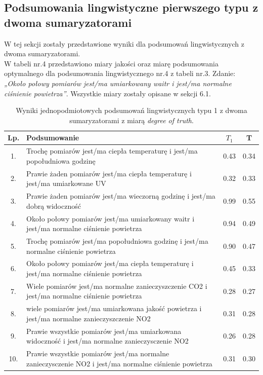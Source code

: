 \documentclass{article}
\begin{document}
\subsection{Podsumowania lingwistyczne pierwszego typu z dwoma sumaryzatorami}
W tej sekcji zostały przedstawione wyniki dla podsumowań lingwistycznych z dwoma sumaryzatorami.\\
W tabeli nr.4 przedstawiono miary jakości oraz miarę podsumowania optymalnego dla podsumowania lingwistycznego nr.4 z tabeli nr.3. Zdanie: \textit{„Około połowy pomiarów  jest/ma umiarkowany waitr i jest/ma normalne ciśnienie powietrza”}. Wszystkie miary zostały opisane w sekcji 6.1.


\begin{table}[H]
\begin{center}
\normalsize %
\begin{tabular}{|c|p{8cm}|c|c|} %
\hline
\textbf{Lp.} & \textbf{Podsumowanie} & \textbf{\(T_1\)} & \textbf{T} \\ \hline
1. & Trochę pomiarów jest/ma ciepła temperaturę i jest/ma popołudniowa godzinę & 0.43 & 0.34 \\ \hline
2. & Prawie żaden pomiarów jest/ma ciepła temperaturę i jest/ma umiarkowane UV & 0.32 & 0.33 \\ \hline
3. & Prawie żaden pomiarów jest/ma wieczorną godzinę i jest/ma dobrą widoczność & 0.99 & 0.55 \\ \hline
4. & Około połowy pomiarów  jest/ma umiarkowany waitr i jest/ma normalne ciśnienie powietrza & 0.94 & 0.49 \\ \hline
5. & Trochę pomiarów jest/ma popołudniowa godzinę i jest/ma normalne ciśnienie powietrza & 0.90 & 0.47 \\ \hline
6. & Około połowy pomiarów jest/ma ciepła temperaturę i jest/ma normalne ciśnienie  powietrza & 0.45 & 0.33 \\ \hline
7. & Wiele pomiarów  jest/ma normalne zanieczyszczenie CO2 i jest/ma normalne ciśnienie powietrza & 0.28 & 0.27 \\ \hline
8. & wiele pomiarów  jest/ma umiarkowana jakość powietrza i jest/ma normalne zanieczyszczenie NO2 & 0.31 & 0.28 \\ \hline
9. & Prawie wszystkie pomiarów  jest/ma umiarkowana widoczność i jest/ma normalne zanieczysczenie NO2 & 0.26 & 0.28 \\ \hline
10. & Prawie wszystkie pomiarów  jest/ma normalne zanieczysczenie NO2 i jest/ma normalne ciśnienie powietrza & 0.31 & 0.30 \\ \hline
\end{tabular}
\caption{Wyniki jednopodmiotowych podsumowań lingwistycznych typu 1 z dwoma sumaryzatorami z miarą \textit{degree of truth}.}
\end{center}
\end{table}
\end{document}
